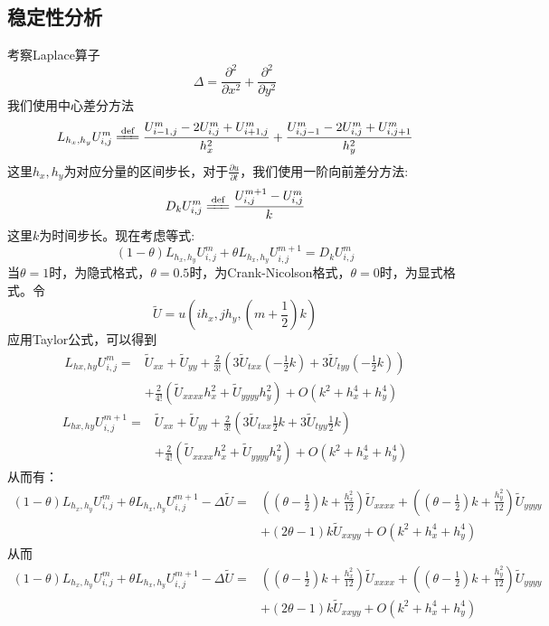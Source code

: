 \documentclass[12pt]{ctexart}
\newcommand{\eqdef}{\xlongequal{\text{def}}}%
\begin{document}
\subsection{稳定性分析}
考察Laplace算子$$\Delta = \frac{\partial^2}{\partial x^2} + \frac{\partial^2}{\partial y^2}$$
\noindent 我们使用中心差分方法
$$
L_{h_x,h_y}U_{i,j}^m \eqdef \frac{U_{i-1,j}^m-2U_{i,j}^m+U_{i+1,j}^m}{h_x^2} + \frac{U_{i,j-1}^m-2U_{i,j}^m+U_{i,j+1}^m}{h_y^2}
$$
\noindent
这里$h_x,h_y$为对应分量的区间步长，对于$\frac{\partial u}{\partial t}$，\noindent 我们使用一阶向前差分方法:
$$
D_k U_{i,j}^m \eqdef \frac{U_{i,j}^{m+1}-U_{i,j}^m}{k}
$$
这里$k$为时间步长。现在考虑等式:
$$
(1-\theta)L_{h_x,h_y}U_{i,j}^m+\theta L_{h_x,h_y}U_{i,j}^{m+1} = D_kU_{i,j}^m
$$
当$\theta = 1$时，为隐式格式，$\theta=0.5$时，为Crank-Nicolson格式，$\theta=0$时，为显式格式。令
$$\tilde{U} = u\left(ih_x,jh_y,\left(m+\frac{1}{2}\right)k\right)$$
应用Taylor公式，可以得到
$$
\begin{aligned}
L_{hx,hy}U_{i,j}^m =& \tilde{U}_{xx} + \tilde{U}_{yy} + \frac{2}{3!}\left(3\tilde{U}_{txx}\left(-\frac{1}{2}k\right)+3\tilde{U}_{tyy}\left(-\frac{1}{2}k\right)\right) \\
&+\frac{2}{4!}\left(\tilde{U}_{xxxx}h_x^2+\tilde{U}_{yyyy}h_y^2\right)+O(k^2+h_x^4+h_y^4)
\end{aligned}
$$
$$
\begin{aligned}
L_{hx,hy}U_{i,j}^{m+1} =& \tilde{U}_{xx} + \tilde{U}_{yy} + \frac{2}{3!}\left(3\tilde{U}_{txx}\frac{1}{2}k+3\tilde{U}_{tyy}\frac{1}{2}k\right) \\
&+\frac{2}{4!}\left(\tilde{U}_{xxxx}h_x^2+\tilde{U}_{yyyy}h_y^2\right)+O(k^2+h_x^4+h_y^4)
\end{aligned}
$$
从而有：
$$
\begin{aligned}
(1-\theta)L_{h_x,h_y}U_{i,j}^m+\theta L_{h_x,h_y}U_{i,j}^{m+1} - \Delta \tilde{U} =& \left(\left(\theta - \frac{1}{2}\right)k+\frac{h_x^2}{12}\right)\tilde{U}_{xxxx}+\left(\left(\theta - \frac{1}{2}\right)k+\frac{h_y^2}{12}\right)\tilde{U}_{yyyy}\\
&+\left(2\theta - 1\right)k\tilde{U}_{xxyy} + O(k^2+h_x^4+h_y^4)
\end{aligned}
$$
从而
$$
\begin{aligned}
(1-\theta)L_{h_x,h_y}U_{i,j}^m+\theta L_{h_x,h_y}U_{i,j}^{m+1} - \Delta \tilde{U} =& \left(\left(\theta - \frac{1}{2}\right)k+\frac{h_x^2}{12}\right)\tilde{U}_{xxxx}+\left(\left(\theta - \frac{1}{2}\right)k+\frac{h_y^2}{12}\right)\tilde{U}_{yyyy}\\
&+\left(2\theta - 1\right)k\tilde{U}_{xxyy} + O(k^2+h_x^4+h_y^4)
\end{aligned}
$$
\end{document}
